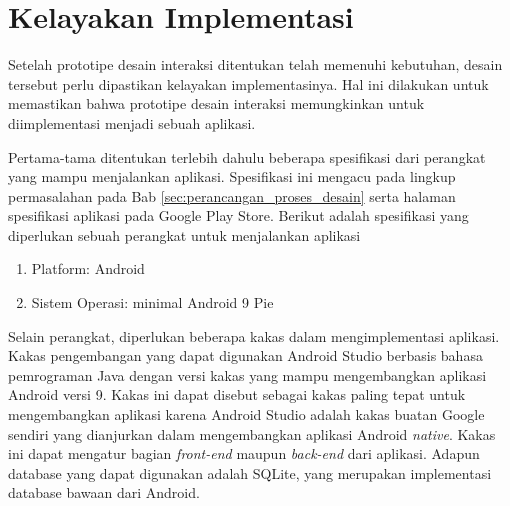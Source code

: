 \section{Kelayakan Implementasi}
\label{sec:kelayakan}

Setelah prototipe desain interaksi ditentukan telah memenuhi kebutuhan, desain tersebut perlu dipastikan kelayakan implementasinya. Hal ini dilakukan untuk memastikan bahwa prototipe desain interaksi memungkinkan untuk diimplementasi menjadi sebuah aplikasi.

Pertama-tama ditentukan terlebih dahulu beberapa spesifikasi dari perangkat yang mampu menjalankan aplikasi. Spesifikasi ini mengacu pada lingkup permasalahan pada Bab \ref{sec:perancangan_proses_desain} serta halaman spesifikasi aplikasi pada Google Play Store. Berikut adalah spesifikasi yang diperlukan sebuah perangkat untuk menjalankan aplikasi

\begin{enumerate}
  \item Platform: Android
  \item Sistem Operasi: minimal Android 9 Pie
\end{enumerate}

Selain perangkat, diperlukan beberapa kakas dalam mengimplementasi aplikasi. Kakas pengembangan yang dapat digunakan Android Studio berbasis bahasa pemrograman Java dengan versi kakas yang mampu mengembangkan aplikasi Android versi 9. Kakas ini dapat disebut sebagai kakas paling tepat untuk mengembangkan aplikasi karena Android Studio adalah kakas buatan Google sendiri yang dianjurkan dalam mengembangkan aplikasi Android \textit{native}. Kakas ini dapat mengatur bagian \textit{front-end} maupun \textit{back-end} dari aplikasi. Adapun database yang dapat digunakan adalah SQLite, yang merupakan implementasi database bawaan dari Android.

